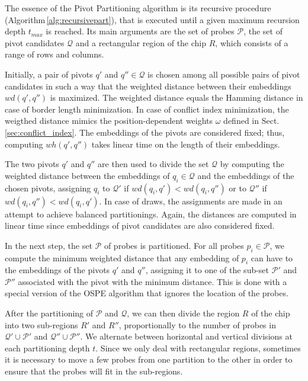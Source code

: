 \documentclass[runningheads]{llncs}
\begin{document}
The essence of the Pivot Partitioning algorithm is its recursive procedure
(Algorithm\,\ref{alg:recursivepart}), that is executed until a given maximum
recursion depth $t_{max}$ is reached. Its main arguments are the set of probes
$\mathcal{P}$, the set of pivot candidates $\mathcal{Q}$ and a rectangular region
of the chip $R$, which consists of a range of rows and columns.

Initially, a pair of pivots $q'$ and $q'' \in \mathcal{Q}$ is chosen among all
possible pairs of pivot candidates in such a way that the weighted distance between
their embeddings $wd(q', q'')$ is maximized. The weighted distance equals the
Hamming distance in case of border length minimization. In case of conflict index
minimization, the weigthed distance mimics the position-dependent weights $\omega$
defined in Sect.\,\ref{sec:conflict_index}. The embeddings of the pivots are
considered fixed; thus, computing $wh(q', q'')$ takes linear time on the length
of their embeddings.

The two pivots $q'$ and $q''$ are then used to divide the set $\mathcal{Q}$
by computing the weighted distance between the embeddings of $q_i \in \mathcal{Q}$
and the embeddings of the chosen pivots, assigning $q_i$ to $\mathcal{Q}'$ if
$wd(q_i, q') < wd(q_i, q'')$ or to $\mathcal{Q}''$ if $wd(q_i, q'') < wd(q_i, q')$.
In case of draws, the assignments are made in an attempt to
achieve balanced partitionings. Again, the distances are computed in linear time
since embeddings of pivot candidates are also considered fixed.

In the next step, the set $\mathcal{P}$ of probes is partitioned. For all probes
$p_i \in \mathcal{P}$, we compute the minimum weighted distance that any embedding
of $p_i$ can have to the embeddings of the pivots $q'$ and $q''$, assigning it to
one of the sub-set $\mathcal{P}'$ and $\mathcal{P}''$ associated with the pivot
with the minimum distance. This is done with a special version of the OSPE algorithm
that ignores the location of the probes.

After the partitioning of $\mathcal{P}$ and $\mathcal{Q}$, we can then divide the
region $R$ of the chip into two sub-regions $R'$ and $R''$, proportionally to the
number of probes in $\mathcal{Q}' \cup \mathcal{P}'$ and $\mathcal{Q}'' \cup \mathcal{P}''$.
We alternate between horizontal and vertical divisions at each partitioning depth $t$.
Since we only deal with rectangular regions, sometimes it is necessary to move
a few probes from one partition to the other in order to ensure that the probes
will fit in the sub-regions.
\end{document}
